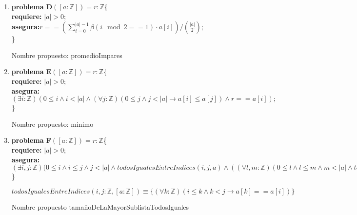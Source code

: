 \documentclass[10pt,a4paper]{article}
\begin{document}
\begin{enumerate}
Nombre propuesto: capicua	
	
\item[d)]

\textbf{problema D}$([a : \mathbb{Z}])=r: \mathbb{Z}$\{ \\
	\textbf{  requiere:} $|a|>0;$\\
	\textbf{  asegura:}$r== (\sum^{|a|-1}_{i=0}\beta (i \mod 2 ==1)\cdot a[i])/(\frac{|a|}{2});$\\
	\}
	
Nombre propuesto: promedioImpares
	
\item[e)]

\textbf{problema E}$([a : \mathbb{Z}])=r: \mathbb{Z}$\{ \\
	\textbf{  requiere:} $|a|>0;$\\
	\textbf{  asegura:}$(\exists i: \mathbb{Z})(0\leq i \wedge i<|a| \wedge (\forall j:\mathbb{Z})(0\leq j \wedge j<|a| \rightarrow a[i]\leq a[j])\wedge r==a[i]);$\\
	\}	
	
Nombre propuesto: minimo
	
\item[f)]

\textbf{problema F}$([a : \mathbb{Z}])=r: \mathbb{Z}$\{ \\
	\textbf{  requiere:} $|a|>0;$\\
	\textbf{  asegura:}$(\exists i,j:\mathbb{Z})(0 \leq i \wedge i\leq j \wedge j<|a| \wedge todosIgualesEntreIndices(i,j,a) \wedge ((\forall l,m:\mathbb{Z})(0\leq l \wedge l\leq m \wedge m<|a| \wedge todosIgualesEntreIndices(l,m,a) \rightarrow j-i\geq m-l) \wedge  r==j-i);$\\
	\}
	
$todosIgualesEntreIndices(i,j:\mathbb{Z},[a:\mathbb{Z}])\equiv \{(\forall k:\mathbb{Z})(i\leq k \wedge k<j \rightarrow a[k]== a[i]) \} $

Nombre propuesto tamañoDeLaMayorSublistaTodosIguales
\end{enumerate}
\end{document}
